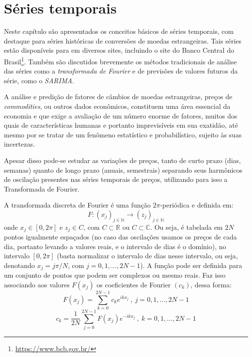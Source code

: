 

\chapter{Séries temporais}
\label{cap:series}

Neste capítulo são apresentados os conceitos básicos de séries temporais, com destaque para séries históricas de conversões de moedas estrangeiras. Tais séries estão disponíveis para  em diversos sites, incluindo o site do Banco Central do Brasil\footnote{\url{https://www.bcb.gov.br/}}. Também são discutidos brevemente os métodos tradicionais de análise das séries como a \emph{transformada de Fourier} e de previsões de valores futuros da série, como o \emph{SARIMA}.

A análise e predição de fatores de câmbios de moedas estrangeiras, preços de \emph{commodities}, ou outros dados econômicos, constituem uma área essencial da economia e que exige a avaliação de um número enorme de fatores, muitos dos quais de características humanas e portanto imprevisíveis em sua exatidão, até mesmo por se tratar de um fenômeno estatístico e probabilístico, sujeito às suas incertezas.

Apesar disso pode-se estudar as variações de preços, tanto de curto prazo (dias, semanas) quanto de longo prazo (anuais, semestrais) separando seus harmônicos de oscilação presentes nas séries temporais de preços, utilizando para isso a Transformada de Fourier.

A transformada discreta de Fourier é uma função $2\pi$-periódica e definida em: \[F:(x_j)_{j \in \mathbb{N}} \rightarrow (z_j)_{j \in \mathbb{N}} \] onde $ x_j \in [0, 2\pi]$ e $ z_j \in C $, com $C \subset \mathbb{R}$ ou $C \subset \mathbb{C}$. Ou seja, é tabelada em $2N$ pontos igualmente espaçados (no caso das oscilações usamos os preços de cada dia, portanto levando a valores reais, e o intervalo de dias é o domínio), no intervalo $[0, 2\pi]$ (basta normalizar o intervalo de dias nesse intervalo, ou seja, denotando $x_j = j\pi/N $, com $j = 0, 1, \dots, 2N-1$). A função pode ser definida para um conjunto de pontos que podem ser complexos ou mesmo reais. Faz isso associando aos valores $F(x_j)$ os coeficientes de Fourier $(c_k)$, dessa forma:
\begin{equation}\label{tfd_1}
F(x_j) = \sum_{k=0}^{2N-1} c_k e^{ikx_j}\ ,\ j=0, 1, \dots, 2N-1
\end{equation}
\begin{equation}\label{tfd_2}
c_k = \frac{1}{2N} \sum_{j=0}^{2N-1} F(x_j) e^{-ikx_j}\ ,\ k=0, 1, \dots, 2N-1
\end{equation}